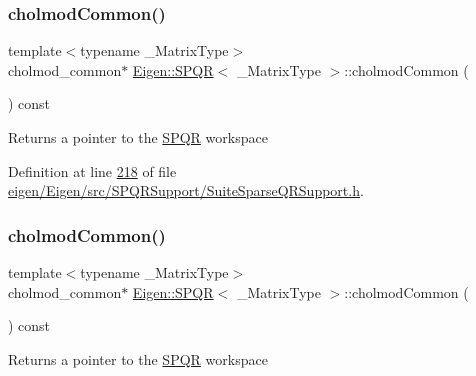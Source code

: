 \subsubsection{\texorpdfstring{cholmod\+Common()}{cholmodCommon()}\hspace{0.1cm}{\footnotesize\ttfamily [1/2]}}
{\footnotesize\ttfamily template$<$typename \+\_\+\+Matrix\+Type$>$ \\
cholmod\+\_\+common$\ast$ \hyperlink{class_eigen_1_1_s_p_q_r}{Eigen\+::\+S\+P\+QR}$<$ \+\_\+\+Matrix\+Type $>$\+::cholmod\+Common (\begin{DoxyParamCaption}{ }\end{DoxyParamCaption}) const\hspace{0.3cm}{\ttfamily [inline]}}

\begin{DoxyReturn}{Returns}
a pointer to the \hyperlink{class_eigen_1_1_s_p_q_r}{S\+P\+QR} workspace 
\end{DoxyReturn}


Definition at line \hyperlink{eigen_2_eigen_2src_2_s_p_q_r_support_2_suite_sparse_q_r_support_8h_source_l00218}{218} of file \hyperlink{eigen_2_eigen_2src_2_s_p_q_r_support_2_suite_sparse_q_r_support_8h_source}{eigen/\+Eigen/src/\+S\+P\+Q\+R\+Support/\+Suite\+Sparse\+Q\+R\+Support.\+h}.

\mbox{\label{class_eigen_1_1_s_p_q_r_a8c7d48d51a1fb08a3e27b8499e5c7f49}} 
\subsubsection{\texorpdfstring{cholmod\+Common()}{cholmodCommon()}\hspace{0.1cm}{\footnotesize\ttfamily [2/2]}}
{\footnotesize\ttfamily template$<$typename \+\_\+\+Matrix\+Type$>$ \\
cholmod\+\_\+common$\ast$ \hyperlink{class_eigen_1_1_s_p_q_r}{Eigen\+::\+S\+P\+QR}$<$ \+\_\+\+Matrix\+Type $>$\+::cholmod\+Common (\begin{DoxyParamCaption}{ }\end{DoxyParamCaption}) const\hspace{0.3cm}{\ttfamily [inline]}}

\begin{DoxyReturn}{Returns}
a pointer to the \hyperlink{class_eigen_1_1_s_p_q_r}{S\+P\+QR} workspace 
\end{DoxyReturn}


